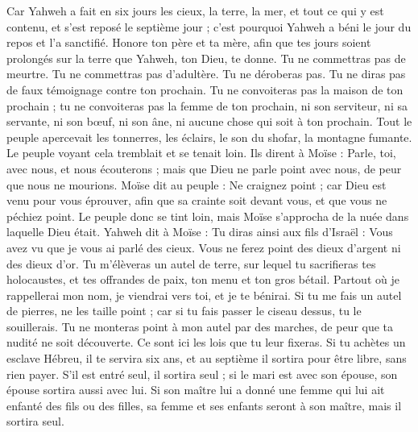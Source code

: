 \begin{multicols}{2}
Car Yahweh a fait en six jours les cieux, la terre, la mer, et tout ce qui y est contenu, et s'est reposé le septième jour ; c'est pourquoi Yahweh a béni le jour du repos et l’a sanctifié.
Honore ton père et ta mère, afin que tes jours soient prolongés sur la terre que Yahweh, ton Dieu, te donne.
Tu ne commettras pas de meurtre.
Tu ne commettras pas d’adultère.
Tu ne déroberas pas.
Tu ne diras pas de faux témoignage contre ton prochain.
Tu ne convoiteras pas la maison de ton prochain ; tu ne convoiteras pas la femme de ton prochain, ni son serviteur, ni sa servante, ni son bœuf, ni son âne, ni aucune chose qui soit à ton prochain.
Tout le peuple apercevait les tonnerres, les éclairs, le son du shofar, la montagne fumante. Le peuple voyant cela tremblait et se tenait loin.
Ils dirent à Moïse : Parle, toi, avec nous, et nous écouterons ; mais que Dieu ne parle point avec nous, de peur que nous ne mourions.
Moïse dit au peuple : Ne craignez point ; car Dieu est venu pour vous éprouver, afin que sa crainte soit devant vous, et que vous ne péchiez point.
Le peuple donc se tint loin, mais Moïse s'approcha de la nuée dans laquelle Dieu était.
Yahweh dit à Moïse : Tu diras ainsi aux fils d'Israël : Vous avez vu que je vous ai parlé des cieux.
Vous ne ferez point des dieux d'argent ni des dieux d'or.
Tu m’élèveras un autel de terre, sur lequel tu sacrifieras tes holocaustes, et tes offrandes de paix, ton menu et ton gros bétail. Partout où je rappellerai mon nom, je viendrai vers toi, et je te bénirai.
Si tu me fais un autel de pierres, ne les taille point ; car si tu fais passer le ciseau dessus, tu le souillerais.
Tu ne monteras point à mon autel par des marches, de peur que ta nudité ne soit découverte.
\VerseOne{}Ce sont ici les lois que tu leur fixeras.
Si tu achètes un esclave Hébreu, il te servira six ans, et au septième il sortira pour être libre, sans rien payer.
S'il est entré seul, il sortira seul ; si le mari est avec son épouse, son épouse sortira aussi avec lui.
Si son maître lui a donné une femme qui lui ait enfanté des fils ou des filles, sa femme et ses enfants seront à son maître, mais il sortira seul.

\end{multicols}
